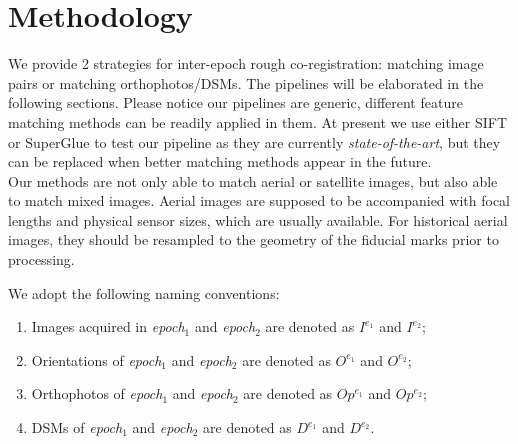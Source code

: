 \section{Methodology}
We provide 2 strategies for inter-epoch rough co-registration: matching image pairs or matching orthophotos/DSMs. The pipelines will be elaborated in the following sections. Please notice our pipelines are generic, different feature matching methods can be readily applied in them. At present we use either SIFT or SuperGlue to test our pipeline as they are currently \textit{state-of-the-art}, but they can be replaced when better matching methods appear in the future.\\
Our methods are not only able to match aerial or satellite images, but also able to match mixed images. Aerial images are supposed to be accompanied with focal lengths and physical sensor sizes, which are usually available. For historical aerial images, they should be resampled to the geometry of the fiducial marks prior to processing. 
\par
We adopt the following naming conventions:\\
\begin{enumerate}
    \item Images acquired in \textit{epoch$_1$} and \textit{epoch$_2$} are denoted as $I^{e_1}$ and $I^{e_2}$;
    \item Orientations of \textit{epoch$_1$} and \textit{epoch$_2$} are denoted as $O^{e_1}$ and $O^{e_2}$; 
    \item Orthophotos of \textit{epoch$_1$} and \textit{epoch$_2$} are denoted as $Op^{e_1}$ and $Op^{e_2}$; 
    \item DSMs of \textit{epoch$_1$} and \textit{epoch$_2$} are denoted as $D^{e_1}$ and $D^{e_2}$.
\end{enumerate}
